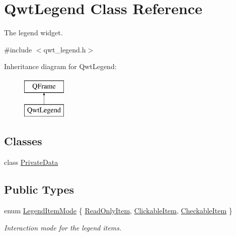 \hypertarget{class_qwt_legend}{\section{Qwt\-Legend Class Reference}
\label{class_qwt_legend}
}


The legend widget.  




{\ttfamily \#include $<$qwt\-\_\-legend.\-h$>$}

Inheritance diagram for Qwt\-Legend\-:\begin{figure}[H]
\begin{center}
\leavevmode
\includegraphics[height=2.000000cm]{class_qwt_legend}
\end{center}
\end{figure}
\subsection*{Classes}
\begin{DoxyCompactItemize}
\item 
class \hyperlink{class_qwt_legend_1_1_private_data}{Private\-Data}
\end{DoxyCompactItemize}
\subsection*{Public Types}
\begin{DoxyCompactItemize}
\item 
enum \hyperlink{class_qwt_legend_ab216dd2dba9ebf6cb0ed2dd621a652e0}{Legend\-Item\-Mode} \{ \hyperlink{class_qwt_legend_ab216dd2dba9ebf6cb0ed2dd621a652e0a82869bcd75310e861ae9257677185186}{Read\-Only\-Item}, 
\hyperlink{class_qwt_legend_ab216dd2dba9ebf6cb0ed2dd621a652e0a90b6ea3ca504d7548cf92cf1c2db60ac}{Clickable\-Item}, 
\hyperlink{class_qwt_legend_ab216dd2dba9ebf6cb0ed2dd621a652e0a035a03d742b4e4f8ab13f435b8954237}{Checkable\-Item}
 \}
\begin{DoxyCompactList}\small\item\em Interaction mode for the legend items. \end{DoxyCompactList}\end{DoxyCompactItemize}
